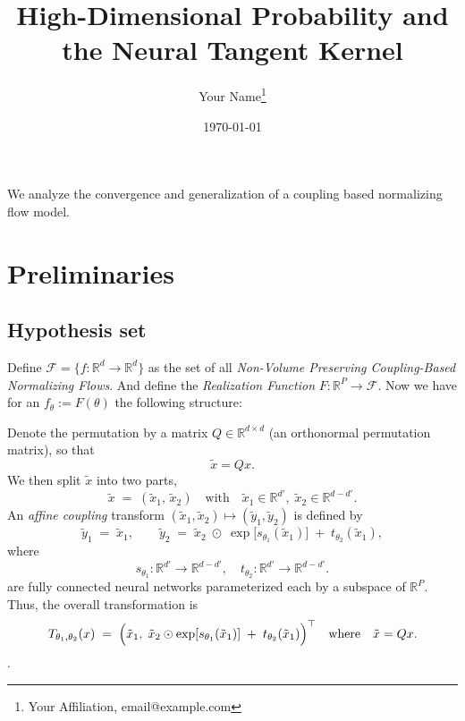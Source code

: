 \documentclass[11pt, a4paper]{article}
\title{High-Dimensional Probability and the Neural Tangent Kernel}
\author{Your Name\thanks{Your Affiliation, email@example.com}}
\date{\today}
\theoremstyle{definition}
\theoremstyle{remark}
\newcommand{\R}{\mathbb{R}}
\begin{document}
	
	\maketitle
	
	
	\begin{abstract}
		
	\end{abstract}
	
	
	We analyze the convergence and generalization of a coupling based normalizing flow model.
	
	\section{Preliminaries}
	
	\subsection{Hypothesis set}
	
	Define \(\mathcal{F} = \{f :\R^d \to \R^d\}\) as the set of all \textit{Non-Volume Preserving Coupling-Based Normalizing Flows}. And define the \textit{Realization Function} \(F:\R^P \to \mathcal{F}\). Now we have for an \(f_\theta := F(\theta)\) the following structure:
	
	Denote the permutation by a matrix $Q \in \mathbb{R}^{d \times d}$ (an orthonormal permutation matrix), 
	so that
	\[
	\tilde{x} = Q x.
	\]
	We then split $\tilde{x}$ into two parts, 
	\[
	\tilde{x} 
	\;=\; (\tilde{x}_1, \,\tilde{x}_2)
	\quad \text{with} \quad
	\tilde{x}_1 \in \mathbb{R}^{d'}, 
	\;\tilde{x}_2 \in \mathbb{R}^{d - d'}.
	\]
	An \emph{affine coupling} transform $(\tilde{x}_1, \tilde{x}_2) \mapsto (\tilde{y}_1, \tilde{y}_2)$ 
	is defined by
	\[
	\tilde{y}_1 
	\;=\; \tilde{x}_1,
	\qquad
	\tilde{y}_2 
	\;=\; \tilde{x}_2 \;\odot\; \exp\bigl[s_{\theta_1}(\tilde{x}_1)\bigr]
	\;+\; t_{\theta_2}(\tilde{x}_1),
	\]
	where 
	\[
	s_{\theta_1}: \mathbb{R}^{d'} \to \mathbb{R}^{d-d'}, 
	\quad
	t_{\theta_2}: \mathbb{R}^{d'} \to \mathbb{R}^{d-d'}.
	\]
	are fully connected neural networks parameterized each by a subspace of $\R^P$. 
	Thus, the overall transformation is 
	\[
	T_{\theta_1,\theta_2}(x) \;=\;
	\Bigl(
	\tilde{x}_1,\;
	\tilde{x}_2 \odot \exp[s_{\theta_1}(\tilde{x}_1)] \;+\; t_{\theta_2}(\tilde{x}_1)
	\Bigr)^\top
	\quad\text{where}\quad 
	\tilde{x} = Q x.
	\].
	
\end{document}
